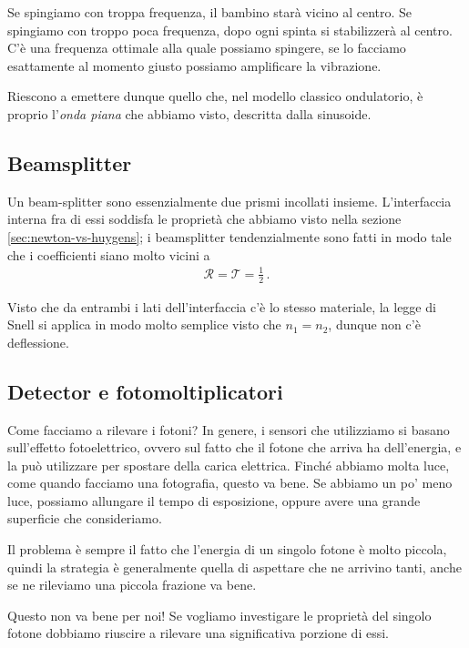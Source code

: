 \documentclass[a4paper,12pt]{article}
\begin{document}
Se spingiamo con troppa frequenza, il bambino starà vicino al centro. Se spingiamo con troppo poca frequenza, dopo ogni spinta si stabilizzerà al centro.
C'è una frequenza ottimale alla quale possiamo spingere, se lo facciamo esattamente al momento giusto possiamo amplificare la vibrazione.

Riescono a emettere dunque quello che, nel modello classico ondulatorio, è proprio l'\emph{onda piana} che abbiamo visto, descritta dalla sinusoide.

\subsection{Beamsplitter}

Un beam-splitter sono essenzialmente due prismi incollati insieme.
L'interfaccia interna fra di essi soddisfa le proprietà che abbiamo visto nella sezione \ref{sec:newton-vs-huygens}; i beamsplitter tendenzialmente sono fatti in modo tale che i coefficienti siano molto vicini a 
%
\begin{align}
\mathcal{R} = \mathcal{T} = \frac{1}{2}
\,.
\end{align}

Visto che da entrambi i lati dell'interfaccia c'è lo stesso materiale, la legge di Snell si applica in modo molto semplice visto che \(n_1 = n_2 \), dunque non c'è deflessione.

\subsection{Detector e fotomoltiplicatori}

Come facciamo a rilevare i fotoni? 
In genere, i sensori che utilizziamo si basano sull'effetto fotoelettrico, ovvero sul fatto che il fotone che arriva ha dell'energia, e la può utilizzare per spostare della carica elettrica.
Finché abbiamo molta luce, come quando facciamo una fotografia, questo va bene. Se abbiamo un po' meno luce, possiamo allungare il tempo di esposizione, oppure avere una grande superficie che consideriamo.

Il problema è sempre il fatto che l'energia di un singolo fotone è molto piccola, quindi la strategia è generalmente quella di aspettare che ne arrivino tanti, anche se ne rileviamo una piccola frazione va bene.

Questo non va bene per noi! Se vogliamo investigare le proprietà del singolo fotone dobbiamo riuscire a rilevare una significativa porzione di essi.
\end{document}
